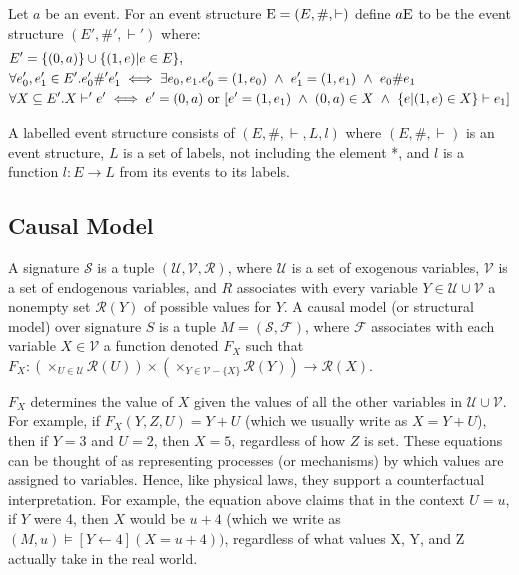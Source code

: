 \begin{definition}[Prefixing]
    Let $a$ be an event.
    For an event structure $\mathrm{E} = (E,\#,\vdash)$ define $a\mathrm{E}$ to be the event structure $(E',\#',\vdash')$ where:
    \begin{align*}
         & E' = \{(0,a)\} \cup \{(1,e)|e \in E\},                                                                               \\
         & \forall e_0',e_1'\in E' . e_0' \#' e_1'  \iff \exists e_0,e_1.e_0' = (1,e_0)
        \ \wedge \ e_1' = (1,e_1) \ \wedge \ e_0 \# e_1                                                                         \\
         & \forall X \subseteq E' . X \vdash' e' \iff e' = (0,a) \text{ or } [e' = (1,e_1) \ \wedge \ (0,a)\in X \ \wedge \ \{e|(1,e)\in X\} \vdash e_1]
    \end{align*}
\end{definition}


\begin{definition}
    A labelled event structure consists of $(E,\#,\vdash,L,l)$ where
    $(E,\#,\vdash)$ is an event structure, $L$ is a set of labels,
    not including the element *, and $l$ is a function $l: E \rightarrow L$
    from its events to its labels.
\end{definition}

\subsection{Causal Model \cite{hp}}
A signature $\mathcal{S}$ is a tuple $(\mathcal{U},\mathcal{V},\mathcal{R})$,
where $\mathcal{U}$ is a set of exogenous variables, $\mathcal{V}$
is a set of endogenous variables, and $R$ associates with every variable
$Y\in \mathcal{U}\cup \mathcal{V}$ a nonempty set $\mathcal{R}(Y)$ of possible values for $Y$.
A causal model (or structural model) over signature $S$ is a tuple
$M=(\mathcal{S},\mathcal{F})$, where $\mathcal{F}$ associates with
each variable $X \in \mathcal{V}$ a function denoted $F_X$ such that
$F_X: (\times_{U\in \mathcal{U}}\mathcal{R}(U))\times (\times_{Y\in\mathcal{V}-\{X\}}\mathcal{R}(Y))\rightarrow \mathcal{R}(X)$.

$F_X$ determines the value of $X$ given the values of all the other variables
in $\mathcal{U}\cup \mathcal{V}$.
For example, if $F_X(Y,Z,U)=Y+U$ (which we usually write as $X = Y + U$),
then if $Y=3$ and $U=2$, then $X = 5$, regardless of how $Z$ is set.
These equations can be thought of as representing processes (or mechanisms) by which values are assigned to variables. Hence, like physical laws, they support a counterfactual interpretation.
For example, the equation above claims that in the context $U=u$, if $Y$ were 4, then $X$ would be $u+4$ (which we write as $(M,u) \models [Y\leftarrow 4](X = u + 4))$, regardless of what values X, Y, and Z actually take in the real world.


